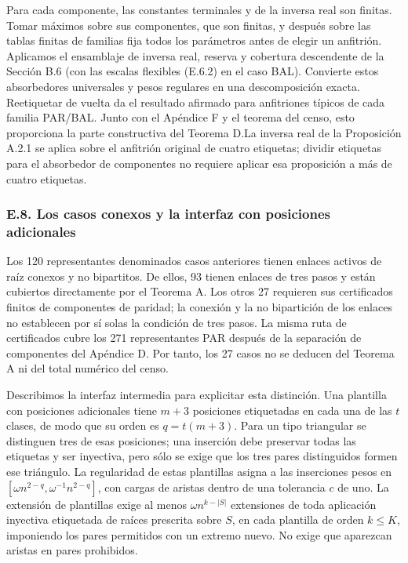 \documentclass[spanish,11pt,a4paper]{article}
\begin{document}
Para cada componente, las constantes terminales y de la inversa real son finitas. Tomar máximos sobre sus componentes, que son finitas, y después sobre las tablas finitas de familias fija todos los parámetros antes de elegir un anfitrión. Aplicamos el ensamblaje de inversa real, reserva y cobertura descendente de la Sección B.6 (con las escalas flexibles (E.6.2) en el caso BAL). Convierte estos absorbedores universales y pesos regulares en una descomposición exacta. Reetiquetar de vuelta da el resultado afirmado para anfitriones típicos de cada familia PAR/BAL. Junto con el Apéndice F y el teorema del censo, esto proporciona la parte constructiva del Teorema D.La inversa real de la Proposición A.2.1 se aplica sobre el anfitrión original de cuatro etiquetas; dividir etiquetas para el absorbedor de componentes no requiere aplicar esa proposición a más de cuatro etiquetas.

\bigskip

\subsubsection{E.8. Los casos conexos y la interfaz con posiciones adicionales}\label{e.8.-los-casos-conexos-y-la-interfaz-con-posiciones-adicionales}

Los 120 representantes denominados casos anteriores tienen enlaces activos de raíz conexos y no bipartitos. De ellos, 93 tienen enlaces de tres pasos y están cubiertos directamente por el Teorema A. Los otros 27 requieren sus certificados finitos de componentes de paridad; la conexión y la no bipartición de los enlaces no establecen por sí solas la condición de tres pasos. La misma ruta de certificados cubre los 271 representantes PAR después de la separación de componentes del Apéndice D. Por tanto, los 27 casos no se deducen del Teorema A ni del total numérico del censo.

Describimos la interfaz intermedia para explicitar esta distinción. Una plantilla con posiciones adicionales tiene \(m+3\) posiciones etiquetadas en cada una de las \(t\) clases, de modo que su orden es \(q=t(m+3)\). Para un tipo triangular se distinguen tres de esas posiciones; una inserción debe preservar todas las etiquetas y ser inyectiva, pero sólo se exige que los tres pares distinguidos formen ese triángulo. La regularidad de estas plantillas asigna a las inserciones pesos en \([\omega n^{2-q},\omega^{-1}n^{2-q}]\), con cargas de aristas dentro de una tolerancia \(c\) de uno. La extensión de plantillas exige al menos \(\omega n^{k-|S|}\) extensiones de toda aplicación inyectiva etiquetada de raíces prescrita sobre \(S\), en cada plantilla de orden \(k\le K\), imponiendo los pares permitidos con un extremo nuevo. No exige que aparezcan aristas en pares prohibidos.
\end{document}
